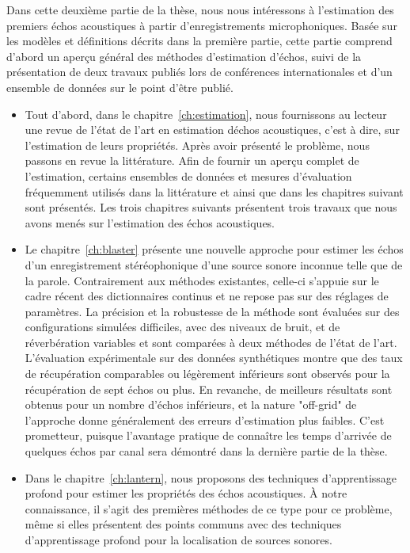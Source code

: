 Dans cette deuxième partie de la thèse, nous nous intéressons à l'estimation des premiers échos acoustiques à partir d'enregistrements microphoniques.
Basée sur les modèles et définitions décrits dans la première partie, cette partie comprend d'abord un aperçu général des méthodes d'estimation d'échos, suivi de la présentation de deux travaux publiés lors de conférences internationales et d'un ensemble de données sur le point d'être publié.
\begin{itemize}
    \item
    Tout d'abord, dans le chapitre~\ref{ch:estimation}, nous fournissons au lecteur une revue de l'état de l'art en estimation déchos acoustiques, c'est à dire, sur l'estimation de leurs propriétés.
    Après avoir présenté le problème, nous passons en revue la littérature.
    Afin de fournir un aperçu complet de l'estimation, certains ensembles de données et mesures d'évaluation fréquemment utilisés dans la littérature et ainsi que dans les chapitres suivant sont présentés.
    Les trois chapitres suivants présentent trois travaux que nous avons menés sur l'estimation des échos acoustiques.
    \item
    Le chapitre~\ref{ch:blaster} présente une nouvelle approche pour estimer les échos d'un enregistrement stéréophonique d'une source sonore inconnue telle que de la parole.
    Contrairement aux méthodes existantes, celle-ci s'appuie sur le cadre récent des dictionnaires continus et ne repose pas sur des réglages de paramètres.
    La précision et la robustesse de la méthode sont évaluées sur des configurations simulées difficiles, avec des niveaux de bruit, et de réverbération variables et sont comparées à deux méthodes de l'état de l'art.
    L'évaluation expérimentale sur des données synthétiques montre que des taux de récupération comparables ou légèrement inférieurs sont observés pour la récupération de sept échos ou plus.
    En revanche, de meilleurs résultats sont obtenus pour un nombre d'échos inférieurs, et la nature "off-grid" de l'approche donne généralement des erreurs d'estimation plus faibles.
    C'est prometteur, puisque l'avantage pratique de connaître les temps d'arrivée de quelques échos par canal sera démontré dans la dernière partie de la thèse.
    \item
    Dans le chapitre~\ref{ch:lantern}, nous proposons des techniques d'apprentissage profond pour estimer les propriétés des échos acoustiques.
    À notre connaissance, il s'agit des premières méthodes de ce type pour ce problème, même si elles présentent des points communs avec des techniques d'apprentissage profond pour la localisation de sources sonores.

\end{itemize}
